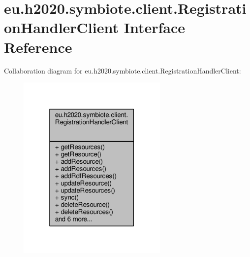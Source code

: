 \hypertarget{interfaceeu_1_1h2020_1_1symbiote_1_1client_1_1RegistrationHandlerClient}{}\section{eu.\+h2020.\+symbiote.\+client.\+Registration\+Handler\+Client Interface Reference}
\label{interfaceeu_1_1h2020_1_1symbiote_1_1client_1_1RegistrationHandlerClient}


Collaboration diagram for eu.\+h2020.\+symbiote.\+client.\+Registration\+Handler\+Client\+:\nopagebreak
\begin{figure}[H]
\begin{center}
\leavevmode
\includegraphics[width=208pt]{interfaceeu_1_1h2020_1_1symbiote_1_1client_1_1RegistrationHandlerClient__coll__graph}
\end{center}
\end{figure}
